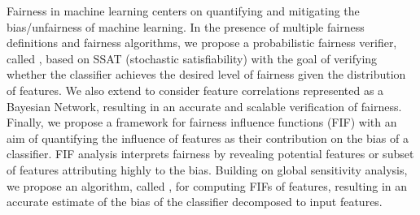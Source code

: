 	
	Fairness in machine learning centers on quantifying and mitigating the bias/unfairness of machine learning. In the presence of multiple fairness definitions and fairness algorithms, we propose a probabilistic fairness verifier, called {\justicia}, based on SSAT (stochastic satisfiability) with the goal of verifying whether the classifier achieves the desired level of fairness given the distribution of features. We also extend {\justicia} to consider feature correlations represented as a Bayesian Network, resulting in an accurate and scalable verification of fairness. Finally, we propose a framework for fairness influence functions (FIF) with an aim of quantifying the influence of features as their contribution on the bias of a classifier. FIF analysis interprets fairness by revealing potential features or subset of features attributing highly to the bias. Building on global sensitivity analysis, we propose an algorithm, called {\fairXplainer}, for computing FIFs of features, resulting in an accurate estimate of the bias of the classifier decomposed to input features. 
	
	


